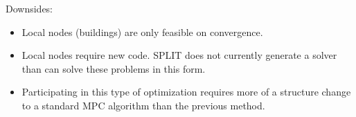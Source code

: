 \documentclass[11pt,a4paper]{article}
\begin{document}
Downsides:
\begin{itemize}
  \item Local nodes (buildings) are only feasible on convergence.
  \item Local nodes require new code. SPLIT does not currently generate a solver than can solve these problems in this form.
  \item Participating in this type of optimization requires more of a structure change to a standard MPC algorithm than the previous method.
\end{itemize}

\end{document}
